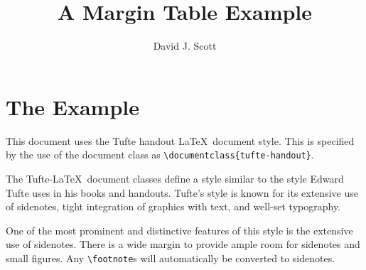 \documentclass{tufte-handout}\usepackage[]{graphicx}\usepackage[]{xcolor}
\title{
A Margin Table Example
}
\author{David J. Scott}
\begin{document}
\section{The Example}
\label{sec:example}

This document uses the Tufte handout \LaTeX\ document style. This is
specified by the use of the document class as
\Verb|\documentclass{tufte-handout}|.

The Tufte-\LaTeX\ document classes define a style similar to the
style Edward Tufte uses in his books and handouts.  Tufte's style is known
for its extensive use of sidenotes, tight integration of graphics with
text, and well-set typography.

One of the most prominent and distinctive features of this style is the
extensive use of sidenotes.  There is a wide margin to provide ample room
for sidenotes and small figures.  Any \Verb|\footnote|s will automatically
be converted to sidenotes.
\end{document}

